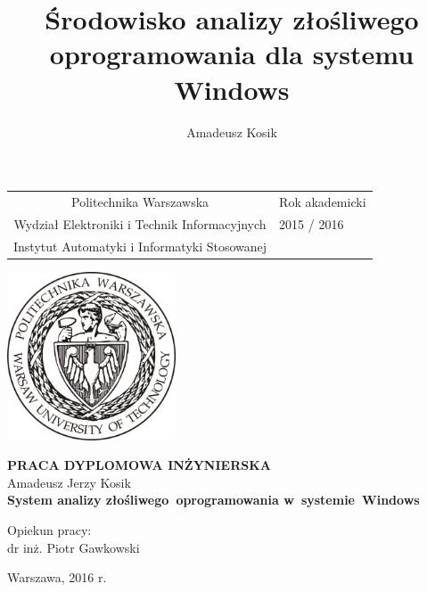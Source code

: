 \documentclass[a4paper,12pt,oneside]{article}
\author{Amadeusz Kosik}
\title{Środowisko analizy złośliwego oprogramowania dla systemu Windows}
\begin{document}
	
	\begin{titlepage} 
	
		\begin{tabu}to \textwidth {c X[c]}
			Politechnika Warszawska & Rok akademicki \\
			Wydział Elektroniki i Technik Informacyjnych& 2015 / 2016 \\
			Instytut Automatyki i Informatyki Stosowanej & 
		\end{tabu}
		
		\begin{center}
		
		\vfill
		
		\includegraphics[width=5cm]{gfx/logo-pw.jpg}		
		
		\vfill
		
		\Large \textbf{PRACA DYPLOMOWA INŻYNIERSKA} \\[1cm]
		
		\Large Amadeusz Jerzy Kosik \\[1cm] 				
		
		\huge \textbf{System analizy złośliwego~oprogramowania w~systemie~Windows}\\
		
		\vfill
		\vfill
		
		\large
		
		\begin{flushright}
			Opiekun pracy: \\
			dr inż. Piotr Gawkowski
		\end{flushright}
	
		\vfill
		
		\large{Warszawa, 2016 r.}
		
		\end{center}
	
	\end{titlepage} 
	\pagestyle{empty}
	\cleardoublepage 	
	
\end{document}

